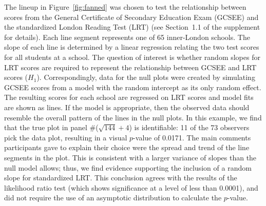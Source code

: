 \documentclass[12pt]{article}
\newcommand{\hh}[1]{{\color{orange} #1}}
\newcommand{\al}[1]{{\color{ForestGreen} #1}}
\newcommand{\alnote}[1]{\todo[inline,color=green!40]{#1}} %
\begin{document}
The lineup in Figure~\ref{fig:fanned} was chosen to test the relationship between scores from the General Certificate of Secondary Education Exam (GCSEE) and the  standardized London Reading Test (LRT) (see Section~1.1 of the supplement for details).  Each line segment represents one of 65 inner-London schools. The slope of each line is determined by a linear regression relating the two test scores for all students at a school. 
The question of interest is whether random slopes for LRT scores are required to  represent the relationship between GCSEE and LRT scores ($H_1$). Correspondingly, data for the null plots  were  created by simulating GCSEE scores from a model with the random intercept as its only random effect.
The resulting scores for each school are regressed on LRT scores and model fits are shown as lines.
 If the model is appropriate, then    the observed data should resemble the overall pattern of the lines in the null plots. In this example, we find that the true plot in panel \#($\sqrt{144} + 4$) is identifiable:  11 of the 73 observers pick the data plot, resulting in a visual $p$-value of 0.0171. The main comments participants gave to explain their choice were the spread and trend of the line segments in the plot. This is consistent with a larger variance of slopes than the null model allows;
  thus, we find evidence supporting the inclusion of a random slope for standardized LRT. This conclusion agrees with the results of the likelihood ratio test (which shows significance at a level of less than 0.0001), and did not require the use of an asymptotic distribution to calculate the $p$-value. 
  
\end{document}
